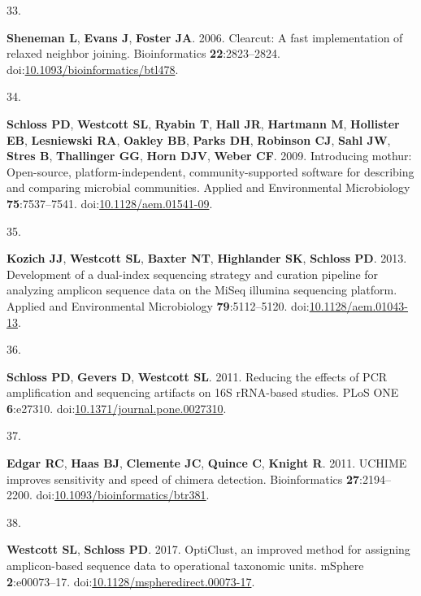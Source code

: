 \documentclass[
  11pt,
]{article}
\newlength{\cslhangindent}
\newlength{\csllabelwidth}
\newenvironment{CSLReferences}[2] %
 {\begin{list}{}{%
  \setlength{\itemindent}{0pt}
  \setlength{\leftmargin}{0pt}
  \setlength{\parsep}{0pt}
  \ifodd #1
   \setlength{\leftmargin}{\cslhangindent}
   \setlength{\itemindent}{-1\cslhangindent}
  \fi
  \setlength{\itemsep}{#2\baselineskip}}}
 {\end{list}}
\newcommand{\CSLLeftMargin}[1]{\parbox[t]{\csllabelwidth}{\strut#1\strut}}
\newcommand{\CSLRightInline}[1]{\parbox[t]{\linewidth - \csllabelwidth}{\strut#1\strut}}
\begin{document}
\begin{CSLReferences}{0}{1}
\CSLLeftMargin{33. }%
\CSLRightInline{\textbf{Sheneman L}, \textbf{Evans J}, \textbf{Foster
JA}. 2006. Clearcut: A fast implementation of relaxed neighbor joining.
Bioinformatics \textbf{22}:2823--2824.
doi:\href{https://doi.org/10.1093/bioinformatics/btl478}{10.1093/bioinformatics/btl478}.}

\CSLLeftMargin{34. }%
\CSLRightInline{\textbf{Schloss PD}, \textbf{Westcott SL},
\textbf{Ryabin T}, \textbf{Hall JR}, \textbf{Hartmann M},
\textbf{Hollister EB}, \textbf{Lesniewski RA}, \textbf{Oakley BB},
\textbf{Parks DH}, \textbf{Robinson CJ}, \textbf{Sahl JW}, \textbf{Stres
B}, \textbf{Thallinger GG}, \textbf{Horn DJV}, \textbf{Weber CF}. 2009.
Introducing mothur: Open-source, platform-independent,
community-supported software for describing and comparing microbial
communities. Applied and Environmental Microbiology
\textbf{75}:7537--7541.
doi:\href{https://doi.org/10.1128/aem.01541-09}{10.1128/aem.01541-09}.}

\CSLLeftMargin{35. }%
\CSLRightInline{\textbf{Kozich JJ}, \textbf{Westcott SL}, \textbf{Baxter
NT}, \textbf{Highlander SK}, \textbf{Schloss PD}. 2013. Development of a
dual-index sequencing strategy and curation pipeline for analyzing
amplicon sequence data on the {MiSeq} illumina sequencing platform.
Applied and Environmental Microbiology \textbf{79}:5112--5120.
doi:\href{https://doi.org/10.1128/aem.01043-13}{10.1128/aem.01043-13}.}

\CSLLeftMargin{36. }%
\CSLRightInline{\textbf{Schloss PD}, \textbf{Gevers D}, \textbf{Westcott
SL}. 2011. Reducing the effects of PCR amplification and sequencing
artifacts on 16S rRNA-based studies. PLoS ONE \textbf{6}:e27310.
doi:\href{https://doi.org/10.1371/journal.pone.0027310}{10.1371/journal.pone.0027310}.}

\CSLLeftMargin{37. }%
\CSLRightInline{\textbf{Edgar RC}, \textbf{Haas BJ}, \textbf{Clemente
JC}, \textbf{Quince C}, \textbf{Knight R}. 2011. {UCHIME} improves
sensitivity and speed of chimera detection. Bioinformatics
\textbf{27}:2194--2200.
doi:\href{https://doi.org/10.1093/bioinformatics/btr381}{10.1093/bioinformatics/btr381}.}

\CSLLeftMargin{38. }%
\CSLRightInline{\textbf{Westcott SL}, \textbf{Schloss PD}. 2017.
{OptiClust}, an improved method for assigning amplicon-based sequence
data to operational taxonomic units. {mSphere} \textbf{2}:e00073--17.
doi:\href{https://doi.org/10.1128/mspheredirect.00073-17}{10.1128/mspheredirect.00073-17}.}


\end{CSLReferences}
\end{document}
